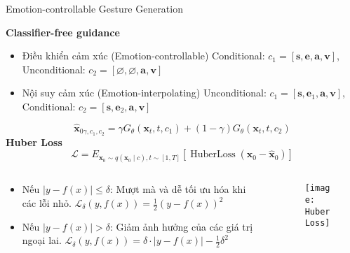 
\begin{frame}{Emotion-controllable Gesture Generation}
	
	\textbf{Classifier-free guidance}
	
	\begin{itemize}
		\item Điều khiển cảm xúc (Emotion-controllable)
		Conditional: $c_1 = [ \mathbf{s}, \mathbf{e}, \mathbf{a} , \mathbf{v}]$,  Unconditional: $c_2 = [ \varnothing, \varnothing, \mathbf{a}, \mathbf{v} ]$
		
		\item Nội suy cảm xúc (Emotion-interpolating)
		Unconditional: $c_1 = [ \mathbf{s}, \mathbf{e}_1, \mathbf{a} , \mathbf{v}]$, Conditional: $c_2 = [ \mathbf{s}, \mathbf{e}_2, \mathbf{a}, \mathbf{v} ]$
	\end{itemize}
	\begin{equation} \label{eq:denoise}
		\hat{\mathbf{x}}_{0 \gamma, c_{1}, c_{2}}=\gamma G_{\theta} \left(\mathbf{x}_{t}, t, c_{1}\right)+(1-\gamma) G_{\theta} \left(\mathbf{x}_{t}, t, c_{2}\right)
	\end{equation}
	\vspace{-5pt}
	\textbf{Huber Loss}
	\begin{equation} \label{eq:huberloss}
		\mathcal{L}=E_{\mathbf{x}_{0} \sim q\left(\mathbf{x}_{0} \mid c\right), t \sim[1, T]}\left[\operatorname{HuberLoss}\left(\mathbf{x}_{0}-\hat{\mathbf{x}}_{0}\right)\right]
	\end{equation}
	\vspace{-5pt}
	\begin{columns}
		\begin{column}{0.5\textwidth}
			\begin{itemize}
				\item Nếu $ |y - f(x)| \leq \delta$:
				Mượt mà và dễ tối ưu hóa khi các lỗi nhỏ.
					$\mathcal{L}_{\delta}(y, f(x)) = \frac{1}{2} (y - f(x))^2$
				\item Nếu $ |y - f(x)| > \delta$: 
				Giảm ảnh hưởng của các giá trị ngoại lai.
					$\mathcal{L}_{\delta}(y, f(x)) =  \delta \cdot |y - f(x)| - \frac{1}{2} \delta^2$
			\end{itemize}
		\end{column}
		\begin{column}{0.5\textwidth}
			\begin{figure}
				\centering
				\texttt{[image: HuberLoss]}
			\end{figure}
		\end{column}
	\end{columns}
	
\end{frame}



